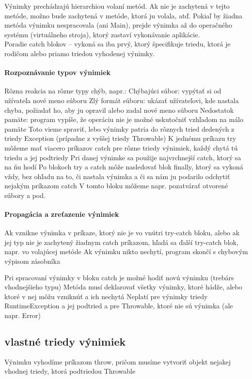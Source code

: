 	Výnimky prechádzajú hierarchiou volaní metód. Ak nie je zachytená v tejto metóde, možno bude zachytená v metóde, ktorá ju volala, atď. Pokiaľ by žiadna metóda výnimku nespracovala (ani Main), prejde výnimka až do operačného systému (virtuálneho stroja), ktorý zastaví vykonávanie aplikácie. \\

	Poradie catch blokov -- vykoná sa iba prvý, ktorý špecifikuje triedu, ktorá je rodičom alebo priamo triedou vyhodenej výnimky.\\


	\paragraph{Rozpoznávanie typov výnimiek}
	Rôzna reakcia na rôzne typy chýb, napr.:
	Chýbajúci súbor: vypýtať si od užívateľa nové meno súboru
	Zlý formát súboru: ukázať užívateľovi, kde nastala chyba, požiadať ho, aby ju opravil alebo zadal nové meno súboru
	Nedostatok pamäte: program vypíše, že operáciu nie je možné uskutočniť vzhľadom na málo pamäte
	Toto vieme spraviť, lebo výnimky patria do rôznych tried dedených z triedy Exception (prípadne z vyššej triedy Throwable)
	K jednému príkazu try môžeme mať viacero príkazov catch pre rôzne triedy výnimiek, každý chytá tú triedu a jej podtriedy
	Pri danej výnimke sa použije najvrchnejší catch, ktorý sa na ňu hodí
	Po blokoch try a catch môže nasledovať blok finally, ktorý sa vykoná vždy, bez ohľadu na to, či nastala výnimka a či sa nám ju podarilo odchytiť nejakým príkazom catch
	V tomto bloku môžeme napr. pozatvárať otvorené súbory a pod.


	\paragraph{Propagácia a zreťazenie výnimiek}
	Ak vznikne výnimka v príkaze, ktorý nie je vo vnútri try-catch bloku, alebo ak jej typ nie je zachytený žiadnym catch príkazom, hľadá sa ďalší try-catch blok, napr. vo volajúcej metóde
	Ak výnimku nikto nechytí, program skončí s chybovým výpisom zásobníka

	Pri spracovaní výnimky v bloku catch je možné hodiť novú výnimku (trebárs vhodnejšieho typu)
	Metóda musí deklarovať všetky výnimky, ktoré hádže, alebo ktoré v nej môžu vzniknúť a ich nechytá
	Neplatí pre výnimky triedy RuntimeException a jej podtried a pre Throwable, ktoré nie sú výnimka (ale napr. Error)


	\subsection{vlastné triedy výnimiek}
	Výnimku vyhodíme príkazom throw, pričom musíme vytvoriť objekt nejakej vhodnej triedy, ktorá podtriedou Throwable



